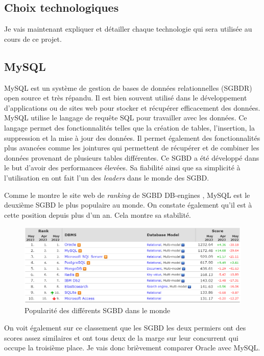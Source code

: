 \subsection{Choix technologiques}
Je vais maintenant expliquer et détailler chaque technologie qui sera utilisée au cours de ce projet.

\subsection{MySQL}
MySQL est un système de gestion de bases de données relationnelles (SGBDR) open source et très répandu. Il est bien souvent utilisé dans le développement d'applications ou de sites web pour stocker et récupérer efficacement des données. MySQL utilise le langage de requête SQL pour travailler avec les données. Ce langage permet des fonctionnalités telles que la création de tables, l'insertion, la suppression et la mise à jour des données. Il permet également des fonctionnalités plus avancées comme les jointures qui permettent de récupérer et de combiner les données provenant de plusieurs tables différentes. Ce SGBD a été développé dans le but d'avoir des performances élevées. Sa fiabilité ainsi que sa simplicité à l'utilisation en ont fait l'un des \emph{leaders} dans le monde des SGBD.

Comme le montre le site web de \emph{ranking} de SGBD DB-engines \cite{DBengines}, MySQL est le deuxième SGBD le plus populaire au monde. On constate également qu'il est à cette position depuis plus d'un an. Cela montre sa stabilité.
\begin{center} %
    \begin{figure}[H]
        \includegraphics[width=14cm]{./assets/figures/MySQLPopularity.png}
        \caption{Popularité des différents SGBD dans le monde \label{MySQLPopularity.png}}
    \end{figure}
\end{center}
On voit également sur ce classement que les SGBD les deux permiers ont des scores assez similaires et ont tous deux de la marge sur leur concurrent qui occupe la troisième place. Je vais donc brièvement comparer Oracle avec MySQL.

